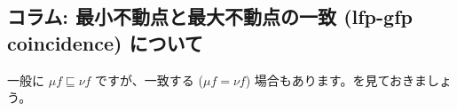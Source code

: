 \documentclass[
		head_space=20mm,
		foot_space=20mm,
		gutter=10mm,
		line_length=190mm
]{jlreq}
\begin{document}


\clearpage

\subsection*{コラム: 最小不動点と最大不動点の一致 (lfp-gfp coincidence) について}

\noindent 一般に $\mu f\sqsubseteq\nu f$ ですが、一致する ($\mu f=\nu f$) 場合もあります。を見ておきましょう。%
\end{document}
